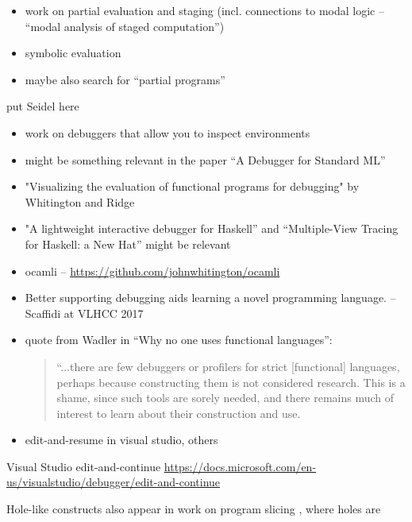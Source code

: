 
\begin{itemize}
	\item work on partial evaluation and staging (incl. connections to modal logic -- ``modal analysis of staged computation'')
	\item symbolic evaluation
	\item maybe also search for ``partial programs'' 
\end{itemize}

put Seidel here


\begin{itemize}
	\item work on debuggers that allow you to inspect environments
  \item might be something relevant in the paper ``A Debugger for Standard ML'' 
  \item "Visualizing the evaluation of functional programs for debugging" by Whitington and Ridge
  \item "A lightweight interactive debugger for Haskell'' and ``Multiple-View Tracing for Haskell: a New Hat'' might be relevant
  \item ocamli -- \url{https://github.com/johnwhitington/ocamli}
  \item Better supporting debugging aids learning a novel programming language. -- Scaffidi at VLHCC 2017
  \item quote from Wadler in ``Why no one uses functional languages'':
    \begin{quote}
    “...there are few debuggers or
profilers for strict [functional] languages, perhaps because constructing them is not considered
research. This is a shame, since such tools are sorely needed, and there remains much of
interest to learn about their construction and use.
    \end{quote}
   \item edit-and-resume in visual studio, others
\end{itemize}

Visual Studio edit-and-continue \url{https://docs.microsoft.com/en-us/visualstudio/debugger/edit-and-continue}

Hole-like constructs also appear in work on program slicing
\cite{DBLP:conf/icfp/PereraACL12}, where holes are 


